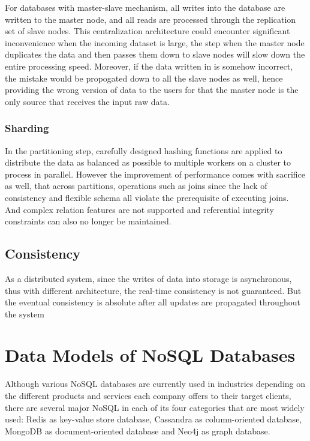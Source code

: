 For databases with master-slave mechanism, all writes into the database are written to the master node, and all reads are processed through the replication set of slave nodes. This centralization architecture could encounter significant inconvenience when the incoming dataset is large, the step when the master node duplicates the data and then passes them down to slave nodes will slow down the entire processing speed. Moreover, if the data written in is somehow incorrect, the mistake would be propogated down to all the slave nodes as well, hence providing the wrong version of data to the users for that the master node is the only source that receives the input raw data.

\subsubsection{Sharding}\mbox{}

In the partitioning step, carefully designed hashing functions are applied to distribute the data as balanced as possible to multiple workers on a cluster to process in parallel. However the improvement of performance comes with sacrifice as well, that across partitions, operations such as joins since the lack of consistency and flexible schema all violate the prerequisite of executing joins. And complex relation features are not supported and referential integrity constraints can also no longer be maintained.


\subsection{Consistency}\mbox{}

As a distributed system, since the writes of data into storage is asynchronous, thus with different architecture, the real-time consistency is not guaranteed. But the eventual consistency is absolute after all updates are propagated throughout the system 




\section{Data Models of NoSQL Databases}

Although various NoSQL databases are currently used in industries depending on the different products and services each company offers to their target clients, there are several major NoSQL in each of its four categories that are most widely used: Redis as key-value store database, Cassandra as column-oriented database, MongoDB as document-oriented database and Neo4j as graph database.
